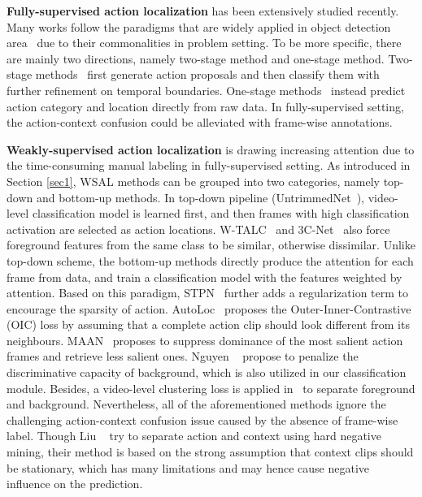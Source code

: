 \documentclass[10pt,twocolumn,letterpaper]{article}
\begin{document}
\textbf{Fully-supervised action localization} has been extensively studied recently.
Many works follow the paradigms that are widely applied in object detection area~\cite{girshick2014rich,girshick2015fast,ren2015faster,redmon2016you,liu2016ssd} due to their commonalities in problem setting.
To be more specific, there are mainly two directions, namely two-stage method and one-stage method.
Two-stage methods~\cite{zhao2017temporal,xu2017r,dai2017temporal,chao2018rethinking,shou2016temporal,shou2017cdc,gao2017cascaded,heilbron2017scc,lin2018bsn} first generate action proposals and then classify them with further refinement on temporal boundaries.
One-stage methods~\cite{buch2017end,lin2017single,zhang2018s3d} instead predict action category and location directly from raw data.
In fully-supervised setting, the action-context confusion could be alleviated with frame-wise annotations.

\textbf{Weakly-supervised action localization} is drawing increasing attention due to the time-consuming manual labeling in fully-supervised setting.
As introduced in Section \ref{sec1}, WSAL methods can be grouped into two categories, namely top-down and bottom-up methods.
In top-down pipeline (\eg UntrimmedNet~\cite{wang2017untrimmednets}), video-level classification model is learned first, and then frames with high classification activation are selected as action locations.
W-TALC~\cite{paul2018w} and 3C-Net~\cite{narayan20193c} also force foreground features from the same class to be similar, otherwise dissimilar.
Unlike top-down scheme, the bottom-up methods directly produce the attention for each frame from data, and train a classification model with the features weighted by attention.
Based on this paradigm, STPN~\cite{nguyen2018weakly} further adds a regularization term to encourage the sparsity of action.
AutoLoc~\cite{shou2018autoloc} proposes the Outer-Inner-Contrastive (OIC) loss by assuming that a complete action clip should look different from its neighbours.
MAAN~\cite{yuan2018marginalized} proposes to suppress dominance of the most salient action frames and retrieve less salient ones.
Nguyen \etal~\cite{nguyen2019weakly} propose to penalize the discriminative capacity of background, which is also utilized in our classification module.
Besides, a video-level clustering loss is applied in~\cite{nguyen2019weakly} to separate foreground and background.
Nevertheless, all of the aforementioned methods ignore the challenging action-context confusion issue caused by the absence of frame-wise label.
Though Liu \etal~\cite{liu2019completeness} try to separate action and context using hard negative mining, their method is based on the strong assumption that context clips should be stationary, which has many limitations and may hence cause negative influence on the prediction.
\end{document}
